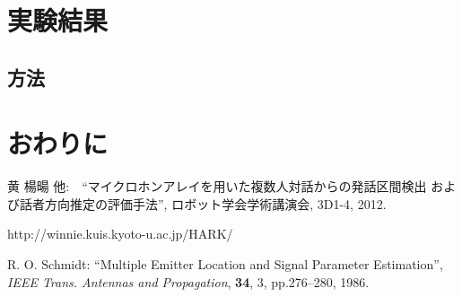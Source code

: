 \documentclass[twocolumn, a4paper]{ieicejsp}
\begin{document}
\section{実験結果}
\subsection{方法}

\section{おわりに}


\begin{thebibliography}{9} \itemsep=-1mm
 黄 楊暘 他:　``マイクロホンアレイを用いた複数人対話からの発話区間検出 および話者方向推定の評価手法'', 
ロボット学会学術講演会, 3D1-4, 2012.

http://winnie.kuis.kyoto-u.ac.jp/HARK/

 R. O. Schmidt: ``Multiple Emitter Location and Signal Parameter Estimation'', {\it IEEE Trans. Antennas and Propagation}, {\bf 34}, 3, pp.276--280, 1986.
\end{thebibliography}
\end{document}
